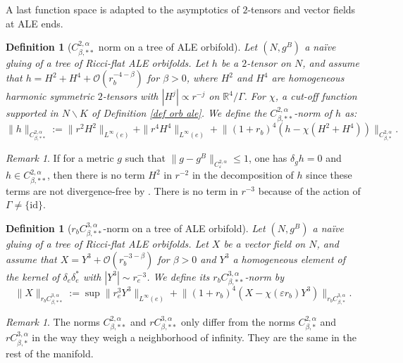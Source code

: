 \documentclass[11pt,reqno]{amsart}
\numberwithin{equation}{section}
\newtheorem{defn}[thm]{Definition}
\theoremstyle{definition}
\theoremstyle{remark}
\newtheorem{remark}[thm]{Remark}
\begin{document}
{ A last function space is adapted to the asymptotics of $2$-tensors and vector fields at ALE ends.

\begin{defn}[$C^{2,\alpha}_{\beta,**}$ norm on a tree of ALE orbifold]\label{norm orbifold ALE}
    Let $(N,g^B)$ a naïve gluing of a tree of Ricci-flat ALE orbifolds. Let $h$ be a $2$-tensor on $N$, and assume that $h = H^2 + H^4 + \mathcal{O}(r_b^{-4-\beta})$ for $\beta>0$, where $H^2$ and $H^4$ are homogeneous harmonic symmetric $2$-tensors with $|H^j| \propto r^{-j}$ on $\mathbb{R}^4/\Gamma$. For $\chi$, a cut-off function supported in $N\backslash K$ of Definition \ref{def orb ale}. We define the $C^{2,\alpha}_{\beta,**}$-norm of $h$ as:
    $$\|h\|_{C^{2,\alpha}_{\beta,**}}:= \|r^2H^2\|_{L^\infty(e)} +\|r^4H^4\|_{L^\infty(e)} + \big\|(1+r_b)^4(h-\chi (H^2+H^4))\big\|_{C^{2,\alpha}_{\beta,*}}.$$
\end{defn}

\begin{remark}\label{rem:gauge **}
    If for a metric $g$ such that $\|g - g^B\|_{C^{2,\alpha}_{\varepsilon}} \leqslant 1$, one has $\delta_{g} h = 0$ and $h\in C^{2,\alpha}_{\beta,**}$, then there is no term $H^2$ in $r^{-2}$ in the decomposition of $h$ since these terms are not divergence-free by \cite[Lemma 2.50]{ozuthese}. There is no term in $r^{-3}$ because of the action of $\Gamma\neq \{\mathrm{id}\}$.
\end{remark}

\begin{defn}[$r_bC^{3,\alpha}_{\beta,**}$-norm on a tree of ALE orbifold]
    Let $(N,g^B)$ a naïve gluing of a tree of Ricci-flat ALE orbifolds. Let $X$ be a vector field on $N$, and assume that $X = Y^3 + \mathcal{O}(r_b^{-3-\beta})$ for $\beta>0$ and $Y^3$ a homogeneous element of the kernel of $\delta_e\delta_e^*$ with $|Y^3|\sim r_e^{-3}$. We define its $r_bC^{3,\alpha}_{\beta,**}$-norm by
    $$\|X\|_{r_bC^{3,\alpha}_{\beta,**}}:= \sup \|r_e^3Y^3\|_{L^\infty(e)} + \big\|(1+r_b)^4(X-\chi(\varepsilon r_b) Y^3)\big\|_{r_bC^{3,\alpha}_{\beta,*}}.$$
\end{defn}}

\begin{remark}
    The norms $ C^{2,\alpha}_{\beta,**}$ and $ rC^{3,\alpha}_{\beta,**}$ only differ from the norms $ C^{2,\alpha}_{\beta,*}$ and $ rC^{3,\alpha}_{\beta,*}$ in the way they weigh a neighborhood of infinity. They are the same in the rest of the manifold.
\end{remark}
\end{document}
